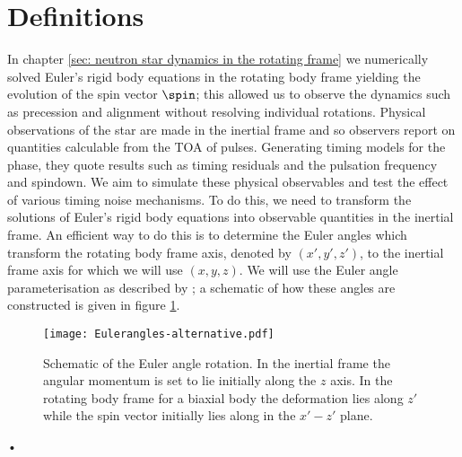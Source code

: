 \documentclass[/home/greg/Thesis/main/main.tex]{subfiles}
\begin{document}
\graphicspath{{/home/greg/Neutron_star_modelling/TimingNoiseModels/InertialSpaceResults/img/}}

\newcommand{\Jr}{J_{\textrm{rot}}}
\newcommand{\Ji}{J_{\textrm{in}}}

\section{Definitions}
In chapter \ref{sec: neutron star dynamics in the rotating frame} we
numerically solved Euler's rigid body equations in the rotating body frame
yielding the evolution of the spin vector $\spin$; this allowed us to observe
the dynamics such as precession and alignment without resolving individual
rotations. Physical observations of the star are made in the inertial frame and
so observers report on quantities calculable from the TOA of pulses. Generating
timing models for the phase, they quote results such as timing residuals and
the pulsation frequency and spindown. We aim to simulate these physical
observables and test the effect of various timing noise mechanisms. To do
this, we need to transform the solutions of Euler's rigid body equations into
observable quantities in the inertial frame. An efficient way to do this is to
determine the Euler angles which transform the rotating body frame axis,
denoted by $(x',y', z')$, to the inertial frame axis for which we will use $(x,
y, z)$. We will use the Euler angle parameterisation as described by
\citet{Landau1969}; a schematic of how these angles are constructed is given in
figure \ref{fig: Euler}. 
\begin{figure}[ht]
\centering
\texttt{[image: Eulerangles-alternative.pdf]}
\caption{Schematic of the Euler angle rotation. In the inertial frame the
angular momentum is set to lie initially along the $z$ axis. In the rotating
body frame for a biaxial body the deformation lies along $z'$ while the spin
vector initially lies along in the $x'- z'$ plane.}
\label{fig: Euler}
\end{figure}•
\end{document}

